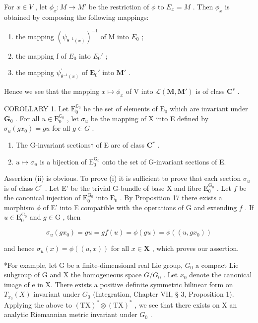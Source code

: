 For \(x \in V\) , let \(\phi_x: M \to M'\) be the restriction of \(\phi\) to \(E_x = M\) . Then \(\phi_x\) is obtained by composing the following mappings:

\begin{enumerate}
\def\labelenumi{(\arabic{enumi})}
\item
  the mapping \((\psi_{\theta^{-1}(x)})^{-1}\) of M into \(E_{0}\) ;
\item
  the mapping f of \(E_{0}\) into \(E_{0}'\) ;
\item
  the mapping \(\psi_{\theta^{-1}(x)}^{\prime}\) of \(\mathbf{E}_0'\) into \(\mathbf{M}'\) .
\end{enumerate}

Hence we see that the mapping \(x \mapsto \phi_x\) of V into \(\mathcal{L}(\mathbf{M}, \mathbf{M}')\) is of class \(\mathbf{C}^r\) .

COROLLARY 1. Let \(\mathrm{E}_0^{\mathbb{G}_0}\) be the set of elements of \(\mathrm{E}_0\) which are invariant under \(\mathbf{G}_0\) . For all \(u \in \mathrm{E}_0^{\mathbb{G}_0}\) , let \(\sigma_u\) be the mapping of X into E defined by \(\sigma_u(gx_0) = gu\) for all \(g \in G\) .

\begin{enumerate}
\def\labelenumi{(\roman{enumi})}
\item
  The G-invariant sections† of E are of class \(\mathbf{C}^r\) .
\item
  \(u \mapsto \sigma_u\) is a bijection of \(\mathrm{E}_0^{\mathrm{G}_0}\) onto the set of G-invariant sections of E.
\end{enumerate}

Assertion (ii) is obvious. To prove (i) it is sufficient to prove that each section \(\sigma_{u}\) is of class \(C^r\) . Let E' be the trivial G-bundle of base X and fibre \(\mathrm{E}_0^{\mathrm{G}_0}\) . Let \(f\) be the canonical injection of \(\mathrm{E}_0^{\mathrm{G}_0}\) into \(\mathrm{E}_0\) . By Proposition 17 there exists a morphism \(\phi\) of E' into E compatible with the operations of G and extending \(f\) . If \(u \in \mathrm{E}_0^{\mathrm{G}_0}\) and \(g \in \mathrm{G}\) , then

\[
\sigma_ {u} (g x _ {0}) = g u = g f (u) = \phi (g u) = \phi ((u, g x _ {0}))
\]

and hence \(\sigma_u(x) = \phi((u, x))\) for all \(x \in \mathbf{X}\) , which proves our assertion.

*For example, let G be a finite-dimensional real Lie group, \(G_{0}\) a compact Lie subgroup of G and X the homogeneous space \(G/G_{0}\) . Let \(x_{0}\) denote the canonical image of e in X. There exists a positive definite symmetric bilinear form on \(T_{x_{0}}(X)\) invariant under \(G_{0}\) (Integration, Chapter VII, § 3, Proposition 1). Applying the above to \((\mathrm{TX})^{*}\otimes(\mathrm{TX})^{*}\) , we see that there exists on X an analytic Riemannian metric invariant under \(G_{0}\) .

